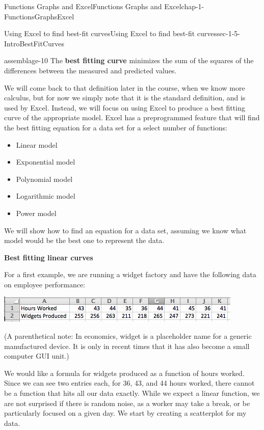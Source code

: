 \documentclass[oneside,10pt,]{book}
\newcommand{\terminology}[1]{\textbf{#1}}
\numberwithin{equation}{section}
\begin{document}
\begin{chapterptx}{Functions Graphs and Excel}{}{Functions Graphs and Excel}{}{}{chap-1-FunctionsGraphsExcel}
\begin{sectionptx}{Using Excel to find best-fit curves}{}{Using Excel to find best-fit curves}{}{}{sec-1-5-IntroBestFitCurves}
\begin{assemblage}{}{assemblage-10}%
\hypertarget{p-368}{}%
The \terminology{best fitting curve} minimizes the sum of the squares of the differences between the measured and predicted values.%
\end{assemblage}
\hypertarget{p-369}{}%
We will come back to that definition later in the course, when we know more calculus, but for now we simply note that it is the standard definition, and is used by Excel.  Instead, we will focus on using Excel to produce a best fitting curve of the appropriate model. Excel has a preprogrammed feature that will find the best fitting equation for a data set for a select number of functions:%
\leavevmode%
\begin{itemize}[label=\textbullet]
\item{}\hypertarget{p-370}{}%
Linear model%
\item{}\hypertarget{p-371}{}%
Exponential model%
\item{}\hypertarget{p-372}{}%
Polynomial model%
\item{}\hypertarget{p-373}{}%
Logarithmic model%
\item{}\hypertarget{p-374}{}%
Power model%
\end{itemize}
\hypertarget{p-375}{}%
We will show how to find an equation for a data set, assuming we know what model would be the best one to represent the data.%
\par
\hypertarget{p-376}{}%
\terminology{Best fitting linear curves}%
\par
\hypertarget{p-377}{}%
For a first example, we are running a widget factory and have the following data on employee performance: \leavevmode%
\begin{sidebyside}{1}{0.1}{0.1}{0}%
\begin{sbspanel}{0.8}%
\includegraphics[width=1\linewidth]{images/sec1-5-1.png}
\end{sbspanel}%
\end{sidebyside}%
%
\par
\hypertarget{p-378}{}%
(A parenthetical note:  In economics, widget is a placeholder name for a generic manufactured device.  It is only in recent times that it has also become a small computer GUI unit.)%
\par
\hypertarget{p-379}{}%
We would like a formula for widgets produced as a function of hours worked.  Since we can see two entries each, for 36, 43, and 44 hours worked, there cannot be a function that hits all our data exactly.  While we expect a linear function, we are not surprised if there is random noise, as a worker may take a break, or be particularly focused on a given day.  We start by creating a scatterplot for my data. \leavevmode%

\end{sectionptx}
\end{chapterptx}
\end{document}
